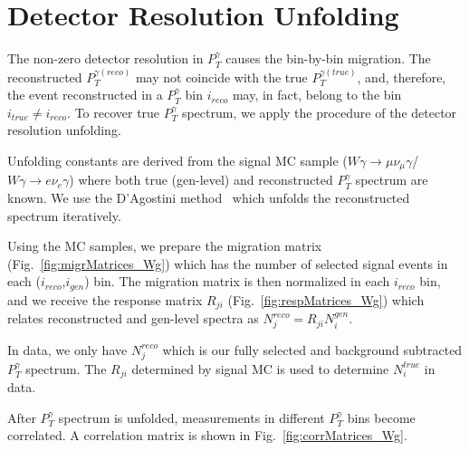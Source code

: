 \section{Detector Resolution Unfolding}
\label{sec:Unfolding}



The non-zero detector resolution in $P_T^\gamma$ causes the bin-by-bin migration. The reconstructed $P_T^{\gamma(reco)}$ may not coincide with the true $P_T^{\gamma(true)}$, and, therefore, the event reconstructed in a $P_T^{\gamma}$ bin $i_{reco}$ may, in fact, belong to the bin $i_{true} \neq i_{reco}$. To recover true $P_T^{\gamma}$ spectrum, we apply the procedure of the detector resolution unfolding.

Unfolding constants are derived from the signal MC sample ($W\gamma\rightarrow\mu\nu_{\mu}\gamma$/$W\gamma\rightarrow{e}\nu_{e}\gamma$) where both true (gen-level) and reconstructed $P_T^\gamma$ spectrum are known. We use the D'Agostini method~\cite{ref_DAgostini} which unfolds the reconstructed spectrum iteratively.  


Using the MC samples, we prepare the migration matrix (Fig.~\ref{fig:migrMatrices_Wg}) which has the number of selected signal events in each ($i_{reco}$,$i_{gen}$) bin. The migration matrix is then normalized in each $i_{reco}$ bin, and we receive the response matrix $R_{ji}$  (Fig.~\ref{fig:respMatrices_Wg}) which relates reconstructed and gen-level spectra as $N^{reco}_j = R_{ji} N^{gen}_i$.

In data, we only have $N^{reco}_j$ which is our fully selected and background subtracted $P_T^{\gamma}$ spectrum. The $R_{ji}$ determined by signal MC is used to determine $N^{true}_i$ in data.

After $P_T^{\gamma}$ spectrum is unfolded, measurements in different $P_T^{\gamma}$ bins become correlated. A correlation matrix is shown in Fig.~\ref{fig:corrMatrices_Wg}.

